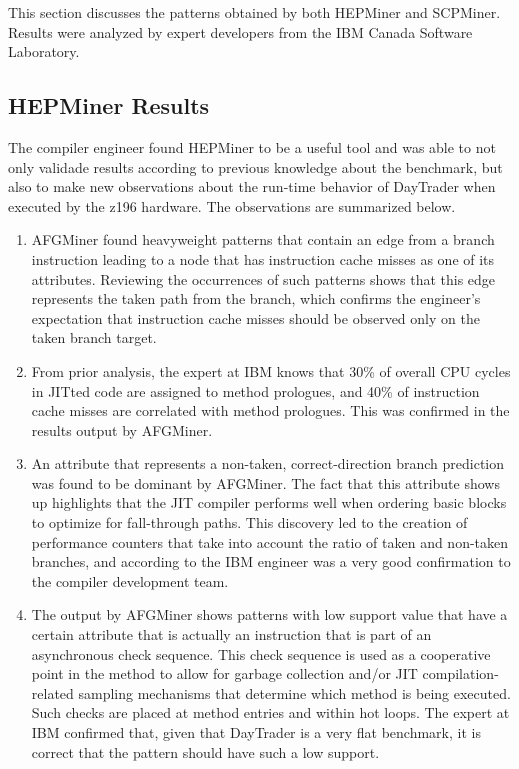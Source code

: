 This section discusses the patterns obtained by both HEPMiner and SCPMiner. Results were analyzed by expert developers from the IBM Canada Software Laboratory.
\subsection{HEPMiner Results}
The compiler engineer found HEPMiner to be a useful tool and was able to not only validade results according to previous knowledge about the benchmark, but also to make new observations about the run-time behavior of DayTrader when executed by the z196 hardware. The observations are summarized below.
\begin{enumerate}
\item AFGMiner found heavyweight patterns that contain an edge from a branch instruction leading to a node that has instruction cache misses as one of its attributes. Reviewing the occurrences of such patterns shows that this edge represents the taken path from the branch, which confirms the engineer's expectation that instruction cache misses should be observed only on the taken branch target.
\item From prior analysis, the expert at IBM knows that 30\% of overall CPU cycles in JITted code are assigned to method prologues, and 40\% of instruction cache misses are correlated with method prologues. This was confirmed in the results output by AFGMiner.
\item An attribute that represents a non-taken, correct-direction branch prediction was found to be dominant by AFGMiner. The fact that this attribute shows up highlights that the JIT compiler performs well when ordering basic blocks to optimize for fall-through paths. This discovery led to the creation of performance counters that take into account the ratio of taken and non-taken branches, and according to the IBM engineer was a very good confirmation to the compiler development team.
\item The output by AFGMiner shows patterns with low support value that have a certain attribute that is actually an instruction that is part of an asynchronous check sequence. This check sequence is used as a cooperative point in the method to allow for garbage collection and/or JIT compilation-related sampling mechanisms that determine which method is being executed. Such checks are placed at method entries and within hot loops. The expert at IBM confirmed that, given that DayTrader is a very flat benchmark, it is correct that the pattern should have such a low support.

\end{enumerate}
